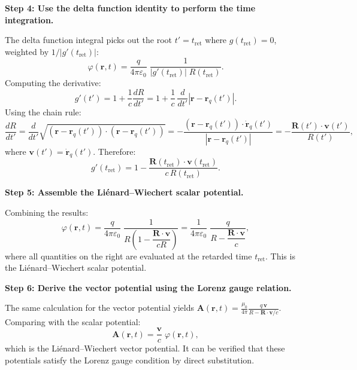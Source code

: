 \textbf{Step 4: Use the delta function identity to perform the time integration.}

The delta function integral picks out the root $t' = t_{\text{ret}}$ where $g(t_{\text{ret}}) = 0$, weighted by $1/|g'(t_{\text{ret}})|$:
\begin{equation}
\varphi(\mathbf{r},t) = \frac{q}{4\pi\varepsilon_{0}}\;\frac{1}{|g'(t_{\text{ret}})|\;R(t_{\text{ret}})}.
\end{equation}
Computing the derivative:
\begin{equation}
g'(t') = 1 + \frac{1}{c}\frac{dR}{dt'} = 1 + \frac{1}{c}\,\frac{d}{dt'}|\mathbf{r}-\mathbf{r}_{q}(t')|.
\end{equation}
Using the chain rule:
\begin{equation}
\frac{dR}{dt'} = \frac{d}{dt'}\sqrt{(\mathbf{r}-\mathbf{r}_{q}(t'))\cdot(\mathbf{r}-\mathbf{r}_{q}(t'))} = -\frac{(\mathbf{r}-\mathbf{r}_{q}(t'))\cdot\dot{\mathbf{r}}_{q}(t')}{|\mathbf{r}-\mathbf{r}_{q}(t')|} = -\frac{\mathbf{R}(t')\cdot\mathbf{v}(t')}{R(t')},
\end{equation}
where $\mathbf{v}(t') = \dot{\mathbf{r}}_{q}(t')$. Therefore:
\begin{equation}
g'(t_{\text{ret}}) = 1 - \frac{\mathbf{R}(t_{\text{ret}})\cdot\mathbf{v}(t_{\text{ret}})}{c\,R(t_{\text{ret}})}.
\end{equation}

\textbf{Step 5: Assemble the Li\'enard--Wiechert scalar potential.}

Combining the results:
\begin{equation}
\varphi(\mathbf{r},t) = \frac{q}{4\pi\varepsilon_{0}}\;\frac{1}{R\!\left(1 - \dfrac{\mathbf{R}\cdot\mathbf{v}}{cR}\right)} = \frac{1}{4\pi\varepsilon_{0}}\;\frac{q}{R - \dfrac{\mathbf{R}\cdot\mathbf{v}}{c}},
\end{equation}
where all quantities on the right are evaluated at the retarded time $t_{\text{ret}}$. This is the Li\'enard--Wiechert scalar potential.

\textbf{Step 6: Derive the vector potential using the Lorenz gauge relation.}

The same calculation for the vector potential yields $\mathbf{A}(\mathbf{r},t) = \frac{\mu_{0}}{4\pi}\frac{q\,\mathbf{v}}{R - \mathbf{R}\cdot\mathbf{v}/c}$. Comparing with the scalar potential:
\begin{equation}
\mathbf{A}(\mathbf{r},t) = \frac{\mathbf{v}}{c}\;\varphi(\mathbf{r},t),
\end{equation}
which is the Li\'enard--Wiechert vector potential. It can be verified that these potentials satisfy the Lorenz gauge condition by direct substitution.

